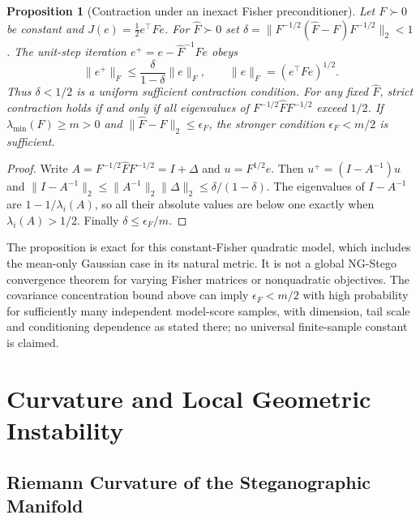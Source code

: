 \documentclass[a4paper,fleqn]{cas-dc}
\newtheorem{proposition}{Proposition}
\begin{document}
\begin{proposition}[Contraction under an inexact Fisher preconditioner]
\label{prop:inexact_fisher_contraction}
Let $F\succ0$ be constant and $J(e)=\tfrac12e^\top Fe$. For
$\widehat F\succ0$ set
$\delta=\|F^{-1/2}(\widehat F-F)F^{-1/2}\|_2<1$.
The unit-step iteration $e^+=e-\widehat F^{-1}Fe$ obeys
\begin{equation}
\|e^+\|_F\le\frac{\delta}{1-\delta}\|e\|_F,
\qquad \|e\|_F=(e^\top Fe)^{1/2}.
\label{eq:inexact_fisher_contraction}
\end{equation}
Thus $\delta<1/2$ is a uniform sufficient contraction condition.
For any fixed $\widehat F$, strict contraction holds if and only if
all eigenvalues of $F^{-1/2}\widehat F F^{-1/2}$ exceed $1/2$.
If $\lambda_{\min}(F)\ge m>0$ and
$\|\widehat F-F\|_2\le\epsilon_F$, the stronger condition
$\epsilon_F<m/2$ is sufficient.
\end{proposition}
\begin{proof}
Write $A=F^{-1/2}\widehat F F^{-1/2}=I+\Delta$ and
$u=F^{1/2}e$. Then $u^+=(I-A^{-1})u$ and
$\|I-A^{-1}\|_2\le\|A^{-1}\|_2\|\Delta\|_2
\le\delta/(1-\delta)$.
The eigenvalues of $I-A^{-1}$ are $1-1/\lambda_i(A)$,
so all their absolute values are below one exactly when
$\lambda_i(A)>1/2$. Finally
$\delta\le\epsilon_F/m$.
\end{proof}
The proposition is exact for this constant-Fisher quadratic model,
which includes the mean-only Gaussian case in its natural metric.
It is not a global NG-Stego convergence theorem for varying Fisher
matrices or nonquadratic objectives. The covariance concentration
bound above can imply $\epsilon_F<m/2$ with high probability for
sufficiently many independent model-score samples, with dimension,
tail scale and conditioning dependence as stated there; no universal
finite-sample constant is claimed.

\section{Curvature and Local Geometric Instability}
\label{sec:curvature}

\subsection{Riemann Curvature of the Steganographic Manifold}
\end{document}
